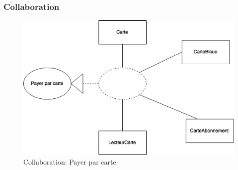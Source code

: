\subsubsection{Collaboration}
\begin{figure}[h]
    \centering
    \includegraphics[scale=0.6]{02_Desenvolvimento/TD2/images/ColaCarte.png}
    \caption{Collaboration: Payer par carte}
\end{figure}